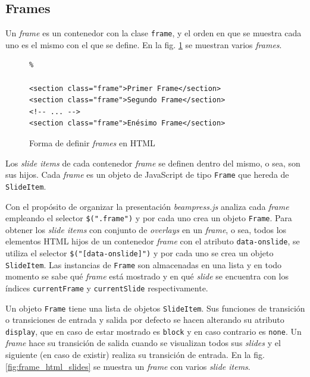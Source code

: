 
		\subsection{Frames} %
		 \label{sub:frames}
		 
		  
			Un \textit{frame} es un contenedor con la clase \texttt{frame}, y el orden en que se muestra cada uno es el mismo con el que se define. En la fig. \ref{fig:frames_html} se muestran varios \textit{frames}.


				\begin{figure}[htb]%
					\begin{lstlisting}%

<section class="frame">Primer Frame</section>
<section class="frame">Segundo Frame</section>
<!-- ... -->
<section class="frame">Enésimo Frame</section>
					\end{lstlisting}
					\caption{Forma de definir \textit{frames} en HTML}
					\label{fig:frames_html}
				\end{figure}

			Los \textit{slide items} de cada contenedor \textit{frame} se definen dentro del mismo, o sea, son sus hijos. Cada \textit{frame} es un objeto de JavaScript de tipo \texttt{Frame} que hereda de \texttt{SlideItem}.


			Con el propósito de organizar la presentación \textit{beampress.js} analiza cada \textit{frame} empleando el selector \texttt{\$(".frame")} y por cada uno crea un objeto \texttt{Frame}. Para obtener los \textit{slide items} con conjunto de \textit{overlays} en un \textit{frame}, o sea, todos los elementos HTML hijos de un contenedor \textit{frame} con el atributo \texttt{data-onslide}, se utiliza el selector \texttt{\$("[data-onslide]")} y por cada uno se crea un objeto \texttt{SlideItem}. Las instancias de \texttt{Frame} son almacenadas en una lista y en todo momento se sabe qué \textit{frame} está mostrado y en qué \textit{slide} se encuentra con los índices \texttt{currentFrame} y \texttt{currentSlide} respectivamente.

			Un objeto \texttt{Frame} tiene una lista de objetos \texttt{SlideItem}. Sus funciones de transición o transiciones de entrada y salida por defecto se hacen alterando su atributo \texttt{display}, que en caso de estar mostrado es \texttt{block} y en caso contrario es \texttt{none}. Un \textit{frame} hace su transición de salida cuando se visualizan todos sus \textit{slides} y el siguiente (en caso de existir) realiza su transición de entrada. En la fig. \ref{fig:frame_html_slides} se muestra un \textit{frame} con varios \textit{slide items}.

